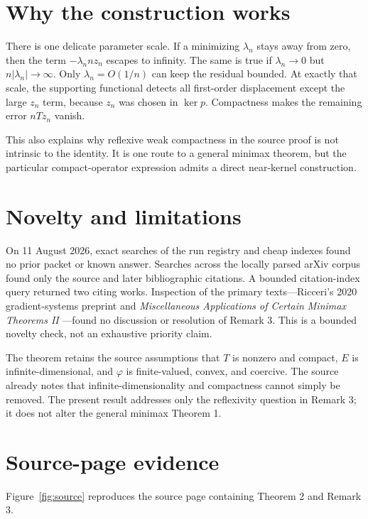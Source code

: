 \documentclass[11pt]{article}
\begin{document}
\section{Why the construction works}

There is one delicate parameter scale.  If a minimizing $\lambda_n$ stays
away from zero, then the term $-\lambda_n nz_n$ escapes to infinity.  The
same is true if $\lambda_n\to0$ but $n|\lambda_n|\to\infty$.  Only
$\lambda_n=O(1/n)$ can keep the residual bounded.  At exactly that scale,
the supporting functional detects all first-order displacement except the
large $z_n$ term, because $z_n$ was chosen in $\ker p$.  Compactness makes
the remaining error $nTz_n$ vanish.

This also explains why reflexive weak compactness in the source proof is not
intrinsic to the identity.  It is one route to a general minimax theorem, but
the particular compact-operator expression admits a direct near-kernel
construction.

\section{Novelty and limitations}

On 11 August 2026, exact searches of the run registry and cheap indexes found
no prior packet or known answer.  Searches across the locally parsed arXiv
corpus found only the source and later bibliographic citations.  A bounded
citation-index query returned two citing works.  Inspection of the primary
texts---Ricceri's 2020 gradient-systems preprint \cite{gradient} and
\emph{Miscellaneous Applications of Certain Minimax Theorems II}
\cite{misc}---found no discussion or resolution of Remark 3.  This is a
bounded novelty check, not an exhaustive priority claim.

The theorem retains the source assumptions that $T$ is nonzero and compact,
$E$ is infinite-dimensional, and $\varphi$ is finite-valued, convex, and
coercive.  The source already notes that infinite-dimensionality and
compactness cannot simply be removed.  The present result addresses only the
reflexivity question in Remark 3; it does not alter the general minimax
Theorem 1.

\appendix
\section{Source-page evidence}

Figure~\ref{fig:source} reproduces the source page containing Theorem 2 and
Remark 3.
\end{document}
